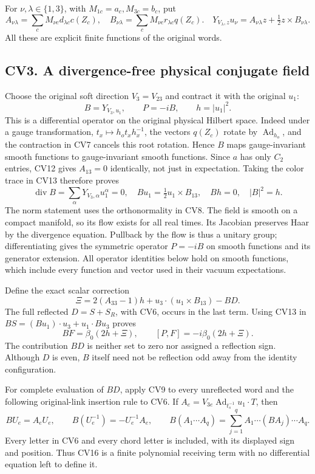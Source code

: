 \documentclass[11pt]{article}
\begin{document}
For \(\nu,\lambda\in\{1,3\}\), with \(M_{1c}=a_c,M_{3c}=b_c\), put
\[
 A_{\nu\lambda}=\sum_cM_{\nu c}d_{\lambda c}c(Z_c),\quad
 B_{\nu\lambda}=\sum_cM_{\nu c}r_{\lambda c}q(Z_c).
 \quad Y_{V_\lambda,z}u_\nu
       =A_{\nu\lambda}z+\tfrac12z\times B_{\nu\lambda}.   \tag{CV13}
\]
All these are explicit finite functions of the original words.

\subsection*{CV3. A divergence-free physical conjugate field}

Choose the original soft direction \(V_3=V_{23}\) and contract it with
the original \(u_1\):
\[
 B=Y_{V_3,u_1},\qquad P=-iB,\qquad h=|u_1|^2.            \tag{CV14}
\]
This is a differential operator on the original physical Hilbert space.
Indeed under a gauge transformation, \(t_x\mapsto h_ot_xh_x^{-1}\),
the vectors \(q(Z_c)\) rotate by \(\operatorname{Ad}_{h_o}\), and
the contraction in CV7 cancels this root rotation. Hence \(B\) maps
gauge-invariant smooth functions to gauge-invariant smooth functions.
Since \(a\) has only \(C_2\) entries, CV12 gives \(A_{13}=0\)
identically, not just in expectation. Taking the color trace in CV13
therefore proves
\[
 \operatorname{div}B=\sum_\alpha Y_{V_3,\alpha}u_1^\alpha=0,
 \quad Bu_1=\tfrac12u_1\times B_{13},\quad Bh=0,
 \quad |B|^2=h.                                        \tag{CV15}
\]
The norm statement uses the orthonormality in CV8. The field is smooth
on a compact manifold, so its flow exists for all real times. Its
Jacobian preserves Haar by the divergence equation. Pullback by the
flow is thus a unitary group; differentiating gives the symmetric
operator \(P=-iB\) on smooth functions and its generator extension.
All operator identities below hold on smooth functions, which include
every function and vector used in their vacuum expectations.

Define the exact scalar correction
\[
 \Xi=2(A_{33}-1)h+u_3\cdot(u_1\times B_{13})-BD.          \tag{CV16}
\]
The full reflected \(D=S+S_R\), with CV6, occurs in the last term.
Using CV13 in \(BS=(Bu_1)\cdot u_3+u_1\cdot Bu_3\) proves
\[
 BF=\beta_0(2h+\Xi),\qquad [P,F]=-i\beta_0(2h+\Xi).
                                                               \tag{CV17}
\]
The contribution \(BD\) is neither set to zero nor assigned a
reflection sign. Although \(D\) is even, \(B\) itself need not be
reflection odd away from the identity configuration.

For complete evaluation of \(BD\), apply CV9 to every unreflected
word and the following original-link insertion rule to CV6. If
\(A_e=V_{3e}\operatorname{Ad}_{t_s^{-1}}u_1\cdot T\), then
\[
 BU_e=A_eU_e,\qquad B(U_e^{-1})=-U_e^{-1}A_e,\qquad
 B(A_1\cdots A_q)=\sum_{j=1}^q A_1\cdots(BA_j)\cdots A_q.
                                                               \tag{CV18}
\]
Every letter in CV6 and every chord letter is included, with its
displayed sign and position. Thus CV16 is a finite polynomial
receiving term with no differential equation left to define it.
\end{document}
